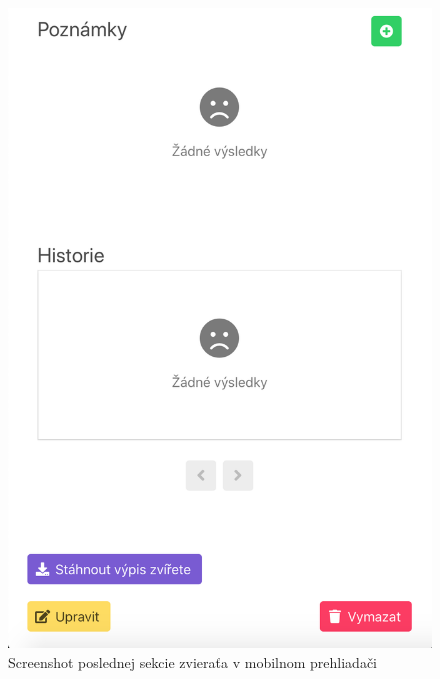 \begin{figure}[H]
	\includegraphics[width=1.0\textwidth]{media/priloha/mobil/6.png}
	\caption{Screenshot poslednej sekcie zvieraťa v mobilnom prehliadači}
\end{figure}
